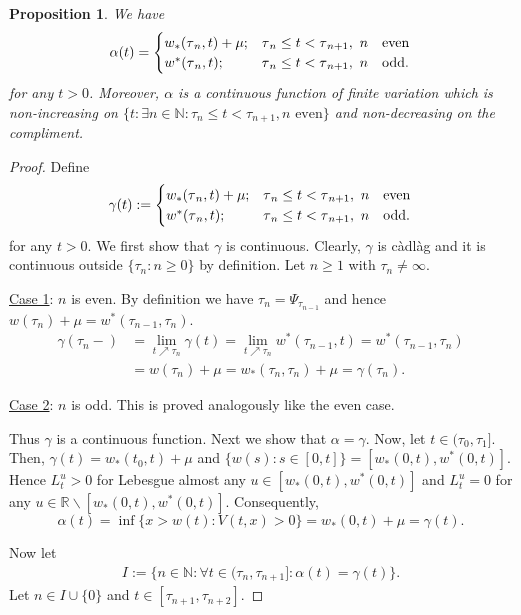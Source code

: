 \documentclass[11pt]{scrartcl}
\newtheorem{proposition}[theorem]{Proposition}
\begin{document}
\begin{proposition}
\label{structure alpha} We have 
\begin{equation*}
\alpha(t) = 
\begin{cases}
w_{\ast}(\tau_{n},t)+\mu; & \tau_{n}\leq t<\tau_{n+1},~n\text{ \textrm{even}}
\\ 
w^{\ast}(\tau_{n},t); & \tau_{n}\leq t<\tau_{n+1},~n\text{ \textrm{odd.}}%
\end{cases}%
\end{equation*}
for any $t> 0$. Moreover, $\alpha$ is a continuous function of finite
variation which is non-increasing on $\{t: \exists n\in\mathbb{N}: \tau_n
\leq t < \tau_{n+1},n\text{ even}\}$ and non-decreasing on the compliment.
\end{proposition}
\begin{proof}
  Define \[
\gamma(t):=%
\begin{cases}
w_{\ast}(\tau_{n},t)+\mu; & \tau_{n}\leq t<\tau_{n+1},~n\text{ \textrm{even}}\\
w^{\ast}(\tau_{n},t); & \tau_{n}\leq t<\tau_{n+1},~n\text{ \textrm{odd.}}%
\end{cases}
\]
for any $t>0$. We first show that $\gamma$ is continuous. Clearly, $\gamma$ is c\`adl\`ag and it is continuous outside $\{\tau_{n}:n\geq0\}$ by
definition. Let $n\geq1$ with $\tau_{n}\neq\infty$.

\underline{Case 1}: $n$ is even. By definition we have $\tau_{n}=\Psi_{\tau_{n-1}}$ and hence
$w(\tau_{n})+\mu=w^{\ast}(\tau_{n-1},\tau_{n})$.
\begin{align*}
\gamma(\tau_{n}-)  &  =\lim_{t\nearrow \tau_{n}}\gamma(t)=\lim_{t\nearrow \tau_{n}%
}w^{\ast}(\tau_{n-1},t)=w^{\ast}(\tau_{n-1},\tau_{n})\\
&  =w(\tau_{n})+\mu=w_{\ast}(\tau_{n},\tau_{n})+\mu=\gamma(\tau_{n}).
\end{align*}

\underline{Case 2}: $n$ is odd. This is proved analogously like the even case.

Thus $\gamma$ is a continuous function. Next we show that $\alpha=\gamma$.
Now, let $t\in(\tau_0,\tau_1]$. Then, $\gamma(t) = w_*(t_0,t)+\mu$ and $\{w(s):s\in [0,t]\} = [w_*(0,t),w^*(0,t)]$. Hence 
$L_t^u>0$ for Lebesgue almost any $u\in[w_*(0,t),w^*(0,t)]$ and $L_t^u=0$ for any $u\in\mathbb R\backslash [w_*(0,t),w^*(0,t)]$. Consequently,
  $$ \alpha(t) = \inf\{x>w(t) : V(t,x)>0 \} = w_*(0,t) + \mu = \gamma(t). $$
  
Now let 
\begin{align*} 
   I:=\{n\in\mathbb N: \forall t\in (\tau_n,\tau_{n+1}]: \alpha(t)=\gamma(t)\}. 
\end{align*}
Let $n\in I\cup\{0\}$ and $t\in [\tau_{n+1},\tau_{n+2}]$.


\end{proof}
\end{document}
